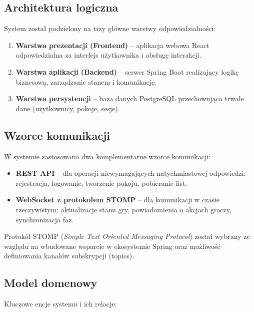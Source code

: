 ﻿\documentclass[a4paper,twoside,11pt]{mwrep}
\theoremstyle{plain} \newtheorem{thm}{Twierdzenie}
\theoremstyle{plain} \newtheorem{lem}{Lemat}
\theoremstyle{definition} \newtheorem{defn}{Definicja}
\theoremstyle{remark} \newtheorem*{rem}{Wniosek}
\begin{document}
\subsection{Architektura logiczna}

System został podzielony na trzy główne warstwy odpowiedzialności:

\begin{enumerate}
    \item \textbf{Warstwa prezentacji (Frontend)} -- aplikacja webowa React odpowiedzialna za interfejs użytkownika i obsługę interakcji.
    
    \item \textbf{Warstwa aplikacji (Backend)} -- serwer Spring Boot realizujący logikę biznesową, zarządzanie stanem i komunikację.
    
    \item \textbf{Warstwa persystencji} -- baza danych PostgreSQL przechowująca trwałe dane (użytkownicy, pokoje, sesje).
\end{enumerate}

\subsection{Wzorce komunikacji}

W systemie zastosowano dwa komplementarne wzorce komunikacji:

\begin{itemize}
    \item \textbf{REST API} -- dla operacji niewymagających natychmiastowej odpowiedzi: rejestracja, logowanie, tworzenie pokoju, pobieranie list.
    
    \item \textbf{WebSocket z protokołem STOMP} -- dla komunikacji w czasie rzeczywistym: aktualizacje stanu gry, powiadomienia o akcjach graczy, synchronizacja faz.
\end{itemize}

Protokół STOMP (\textit{Simple Text Oriented Messaging Protocol}) został wybrany ze względu na wbudowane wsparcie w ekosystemie Spring oraz możliwość definiowania kanałów subskrypcji (topics).

\subsection{Model domenowy}

Kluczowe encje systemu i ich relacje:
\end{document}

